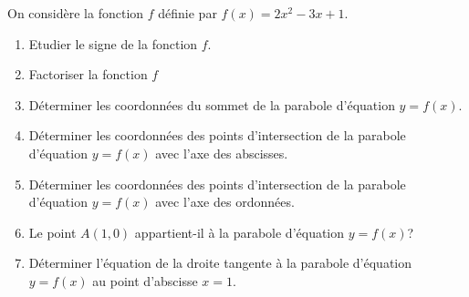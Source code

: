 \begin{exercice_cours}{}

	On considère la fonction $f$ définie par $f(x)=2x^2-3x+1$.
	\begin{enumerate}
		\item Etudier le signe de la fonction $f$.
		\item Factoriser la fonction $f$
		\item Déterminer les coordonnées du sommet de la parabole d'équation $y=f(x)$.
		\item Déterminer les coordonnées des points d'intersection de la parabole d'équation $y=f(x)$ avec l'axe des abscisses.
		\item Déterminer les coordonnées des points d'intersection de la parabole d'équation $y=f(x)$ avec l'axe des ordonnées.
		\item Le point $A(1, 0)$ appartient-il à la parabole d'équation $y=f(x)$?
		\item Déterminer l'équation de la droite tangente à la parabole d'équation $y=f(x)$ au point d'abscisse $x=1$.
	\end{enumerate}
	
\end{exercice_cours}

\pagebreak


